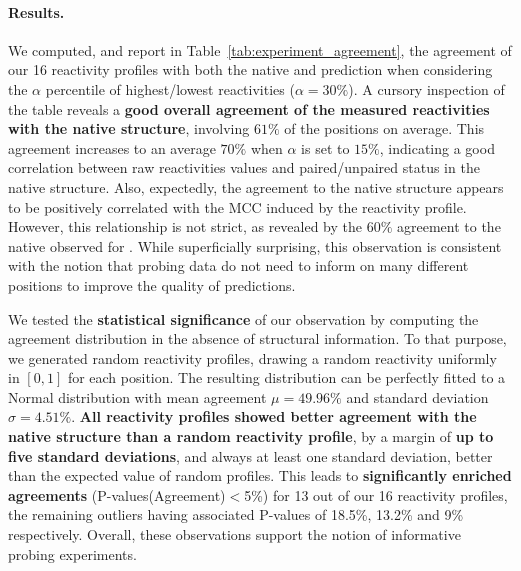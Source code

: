\documentclass[11pt]{article} %
\renewcommand{\Def}[1]{{\bf #1}}
\begin{document}
\paragraph{Results.}We computed, and report in Table~\ref{tab:experiment_agreement}, the agreement of our 16 reactivity profiles with both the native and \OurTool{} prediction when considering the $\alpha$ percentile of highest/lowest reactivities ($\alpha=30\%$). A cursory inspection of the table reveals a {\bf good overall agreement of the measured reactivities with the native structure}, involving $61\%$ of the positions on average. This agreement increases to an average $70\%$ when $\alpha$ is set to $15\%$, indicating a good correlation between raw reactivities values and paired/unpaired status in the native structure. Also, expectedly, the agreement to the native structure appears to be positively correlated with the MCC induced by the reactivity profile. However, this relationship is not strict, as revealed by the $60\%$ agreement to the native observed for \OneMSevILU. While superficially surprising, this observation is consistent with the notion that probing data do not need to inform on many different positions to improve the quality of predictions.



We tested the {\bf statistical significance} of our observation by computing  the agreement distribution in the absence of structural information. To that purpose, we generated random reactivity profiles, drawing a random reactivity uniformly in $[0,1]$ for each position. The resulting distribution can be perfectly fitted to a Normal distribution with mean agreement $\mu=49.96\%$ and standard deviation $\sigma=4.51\%$.  {\bf All reactivity profiles showed better agreement with the native structure than a random reactivity profile}, by a margin of \Def{up to five standard deviations}, and always at least one standard deviation, better than the expected value of random profiles. This leads to \Def{significantly enriched agreements} (P-values(Agreement)$<$5\%) for 13 out of our 16 reactivity profiles, the remaining outliers having associated P-values of 18.5\%, 13.2\% and 9\% respectively. Overall, these observations support the notion of informative probing experiments.


	\newcommand{\SR}[4]{{\begin{minipage}{.48\textwidth}\centering 
			\texttt{[image: graphs/didy/reactivities/\#1]}\\
			#2 -- #4 (Cluster #3)\end{minipage}}}
\end{document}
